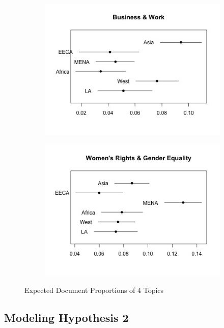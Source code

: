 \documentclass[11pt, oneside]{article}
\begin{document}
\begin{figure}
\begin{subfigure}{.5\textwidth}
  \label{fig:sfig2}
\end{subfigure}
\begin{subfigure}{.5\textwidth}
  \centering
  \includegraphics[width=1\linewidth]{4}
  \label{fig:sfig2}
\end{subfigure}
\begin{subfigure}{.5\textwidth}
  \centering
  \includegraphics[width=1\linewidth]{12}
  \label{fig:sfig2}
\end{subfigure}
\caption{Expected Document Proportions of 4 Topics}
\label{fig:fig}
\end{figure}

\subsection{Modeling Hypothesis 2}
\end{document}
